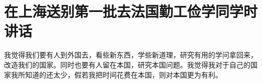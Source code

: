 \section[在上海送别第一批去法国勤工俭学同学时讲话（一九一九年初）]{在上海送别第一批去法国勤工俭学同学时讲话}


我觉得我们要有人到外国去，看些新东西，学些新道理，研究有用的学问拿回来，改造我们的国家。同时也要有人留在本国，研究本国问题。我觉得我对于自己的国家我所知道的还太少，假若我把时间花费在本国，则对本国更为有利。

